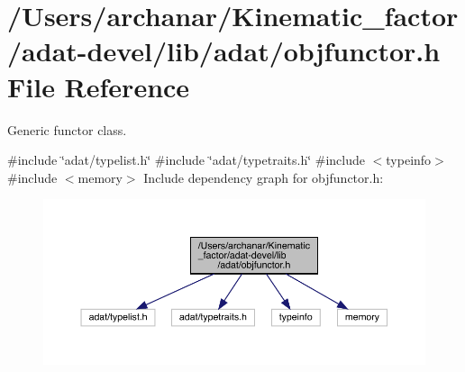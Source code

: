 \hypertarget{adat-devel_2lib_2adat_2objfunctor_8h}{}\section{/\+Users/archanar/\+Kinematic\+\_\+factor/adat-\/devel/lib/adat/objfunctor.h File Reference}
\label{adat-devel_2lib_2adat_2objfunctor_8h}


Generic functor class.  


{\ttfamily \#include \char`\"{}adat/typelist.\+h\char`\"{}}\newline
{\ttfamily \#include \char`\"{}adat/typetraits.\+h\char`\"{}}\newline
{\ttfamily \#include $<$typeinfo$>$}\newline
{\ttfamily \#include $<$memory$>$}\newline
Include dependency graph for objfunctor.\+h\+:
\nopagebreak
\begin{figure}[H]
\begin{center}
\leavevmode
\includegraphics[width=350pt]{d2/d59/adat-devel_2lib_2adat_2objfunctor_8h__incl}
\end{center}
\end{figure}
